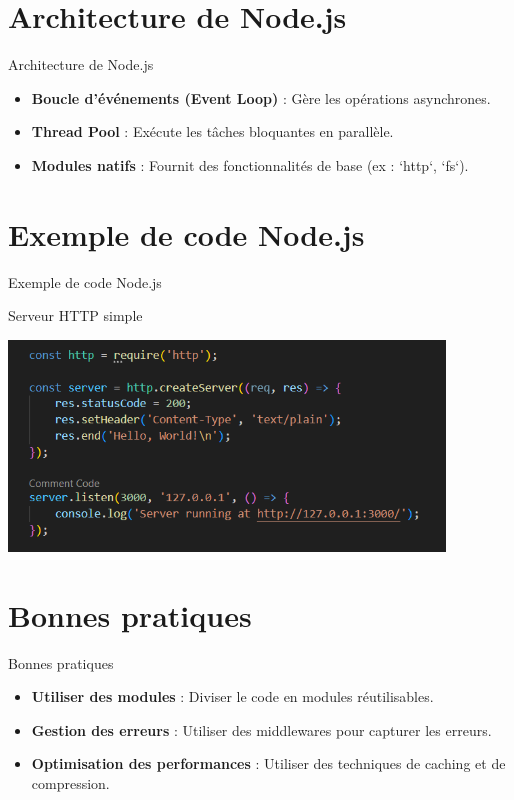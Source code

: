 \documentclass{clbeamer2024}
\begin{document}
	\section{Architecture de Node.js}
	\begin{frame}{Architecture de Node.js}
		\begin{itemize}
			\item \textbf{Boucle d'événements (Event Loop)} : Gère les opérations asynchrones.
			\item \textbf{Thread Pool} : Exécute les tâches bloquantes en parallèle.
			\item \textbf{Modules natifs} : Fournit des fonctionnalités de base (ex : `http`, `fs`).
		\end{itemize}
	\end{frame}
	
	
	\section{Exemple de code Node.js}
	\begin{frame}{Exemple de code Node.js}
		
		\begin{exampleblock}{Serveur HTTP simple}
			
			\begin{center}
			\includegraphics[width=0.87\textwidth]{images/code1.png}
		\end{center}
			
		\end{exampleblock}
		
	\end{frame}
	
	
	\section{Bonnes pratiques}
	\begin{frame}{Bonnes pratiques}
		\begin{itemize}
			\item \textbf{Utiliser des modules} : Diviser le code en modules réutilisables.
			\item \textbf{Gestion des erreurs} : Utiliser des middlewares pour capturer les erreurs.
			\item \textbf{Optimisation des performances} : Utiliser des techniques de caching et de compression.
		\end{itemize}
	\end{frame}
	
\end{document}
